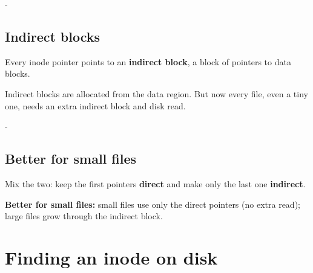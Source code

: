 \documentclass[11pt,a4paper]{article}
\makeatletter
\newcommand{\keepspace}[1]{\par\penalty-100\begingroup
  \setlength{\dimen@}{#1}\dimen@ii\pagegoal\advance\dimen@ii-\pagetotal
  \ifdim\dimen@>\dimen@ii\ifdim\dimen@ii>\z@\vfil\fi\break\fi\endgroup}
\newcommand{\inodetree}[1]{%
  \node[draw=black!70, fill=black!30, minimum size=1.7cm, font=\bfseries,
        text depth=0pt] (ino) at (0,0) {};
  \node[font=\bfseries] at (0,0.25) {inode};
  \foreach \k in {0,...,3} {
    \node[draw=black, fill=white, minimum size=0.32cm, inner sep=0pt]
      (p\k) at (-0.51+\k*0.34, -0.55) {};
  }
  \foreach \t [count=\k from 0] in {#1} {
    \pgfmathsetmacro{\cx}{-4.05+\k*2.7}
    \ifnum\pdfstrcmp{\t}{data}=0
      \node[draw=black!70, fill=black!8, minimum size=1.5cm, font=\bfseries]
        (c\k) at (\cx, -2.6) {data};
    \else
      \node[draw=black!70, fill=black!65, minimum size=1.5cm] (c\k) at (\cx, -2.6) {};
      \node[font=\bfseries, text=white] at (\cx, -2.4) {indirect};
      \foreach \j in {0,...,3} {
        \pgfmathsetmacro{\px}{\cx-0.51+\j*0.34}
        \node[draw=black, fill=white, minimum size=0.3cm, inner sep=0pt]
          (q\k\j) at (\px, -3.1) {};
        \pgfmathsetmacro{\dx}{(\j-1.5)*0.25}
        \draw[-{Latex[length=1.6mm]}, thick] (q\k\j.center) -- ++(\dx, -0.95);
      }
    \fi
    \draw[-{Latex[length=2mm]}, thick] (p\k.center) -- (c\k.north);
  }
}
\makeatother
\begin{document}
\begin{center}
\end{center}

\keepspace{8\baselineskip}
\subsection{Indirect blocks}

Every inode pointer points to an \textbf{indirect block}, a block of pointers
to data blocks.

\begin{center}
\end{center}

Indirect blocks are allocated from the data region. But now every file, even
a tiny one, needs an extra indirect block and disk read.

\keepspace{8\baselineskip}
\subsection{Better for small files}

\begin{quizbox}
Mix the two: keep the first pointers \textbf{direct} and make only the
last one \textbf{indirect}.
\end{quizbox}

\begin{center}
\end{center}
\noindent\textbf{Better for small files:} small files use only the direct
pointers (no extra read); large files grow through the indirect block.


\section{Finding an inode on disk}\label{sec:inodeoffset}
\end{document}
